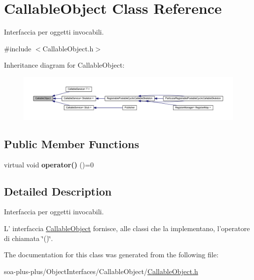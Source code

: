 \hypertarget{class_callable_object}{
\section{CallableObject Class Reference}
\label{class_callable_object}
}


Interfaccia per oggetti invocabili.  




{\ttfamily \#include $<$CallableObject.h$>$}



Inheritance diagram for CallableObject:\nopagebreak
\begin{figure}[H]
\begin{center}
\leavevmode
\includegraphics[width=400pt]{class_callable_object__inherit__graph}
\end{center}
\end{figure}
\subsection*{Public Member Functions}
\begin{DoxyCompactItemize}
\item 
\hypertarget{class_callable_object_a75c1f460e6d85b85d3bf7bb5cff9841f}{
virtual void {\bfseries operator()} ()=0}
\label{class_callable_object_a75c1f460e6d85b85d3bf7bb5cff9841f}

\end{DoxyCompactItemize}


\subsection{Detailed Description}
Interfaccia per oggetti invocabili. 

L' interfaccia \hyperlink{class_callable_object}{CallableObject} fornisce, alle classi che la implementano, l'operatore di chiamata \char`\"{}()\char`\"{}. 

The documentation for this class was generated from the following file:\begin{DoxyCompactItemize}
\item 
soa-\/plus-\/plus/ObjectInterfaces/CallableObject/\hyperlink{_callable_object_8h}{CallableObject.h}\end{DoxyCompactItemize}
